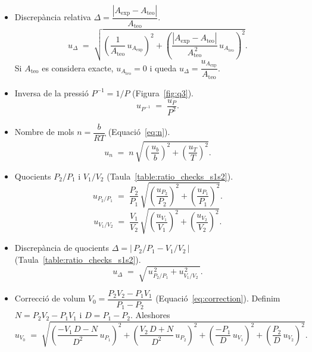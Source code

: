 \documentclass[a4paper,twoside,12pt]{article}
\theoremstyle{definition}
\begin{document}
\begin{itemize}
	\item Discrepància relativa \(\Delta=\dfrac{|A_{\mathrm{exp}}-A_{\mathrm{teo}}|}{A_{\mathrm{teo}}}\).
	\begin{equation}\label{eq:incertesa_delta_A}
		u_\Delta \;=\; 
		\sqrt{\left(\frac{1}{A_{\mathrm{teo}}}\,u_{A_{\mathrm{exp}}}\right)^2
			+\left(\frac{|A_{\mathrm{exp}}-A_{\mathrm{teo}}|}{A_{\mathrm{teo}}^{\,2}}\,u_{A_{\mathrm{teo}}}\right)^2 }.
	\end{equation}
	Si \(A_{\mathrm{teo}}\) es considera exacte, \(u_{A_{\mathrm{teo}}}=0\) i queda \(u_\Delta=\dfrac{u_{A_{\mathrm{exp}}}}{A_{\mathrm{teo}}}\).
	
	\item Inversa de la pressió \(P^{-1}=1/P\) (Figura~\ref{fig:q3}).
	\begin{equation}\label{eq:incertesa_P_inv}
		u_{P^{-1}} \;=\; \frac{u_P}{P^2}.
	\end{equation}
	
	\item Nombre de mols \(n=\dfrac{b}{RT}\) (Equació~\ref{eq:n}).
	\begin{equation}\label{eq:incertesa_n}
		u_n \;=\; n\,\sqrt{\left(\frac{u_b}{b}\right)^2+\left(\frac{u_T}{T}\right)^2 }.
	\end{equation}
	
	\item Quocients \(P_2/P_1\) i \(V_1/V_2\) (Taula~\ref{table:ratio_checks_s1s2}).
	\begin{equation}\label{eq:incertesa_P2sobreP1}
		u_{P_2/P_1} \;=\; \frac{P_2}{P_1}\,
		\sqrt{\left(\frac{u_{P_2}}{P_2}\right)^2+\left(\frac{u_{P_1}}{P_1}\right)^2 }.
	\end{equation}
	\begin{equation}\label{eq:incertesa_V1sobreV2}
		u_{V_1/V_2} \;=\; \frac{V_1}{V_2}\,
		\sqrt{\left(\frac{u_{V_1}}{V_1}\right)^2+\left(\frac{u_{V_2}}{V_2}\right)^2 }.
	\end{equation}
	\item Discrepància de quocients \(\Delta=\big|\,P_2/P_1 - V_1/V_2\,\big|\) (Taula~\ref{table:ratio_checks_s1s2}).
	\begin{equation}\label{eq:incertesa_delta_quotients}
		u_\Delta \;=\; \sqrt{\,u_{P_2/P_1}^{\,2} + u_{V_1/V_2}^{\,2}\,}.
	\end{equation}
	
	\item Correcció de volum \(V_0=\dfrac{P_2V_2-P_1V_1}{P_1-P_2}\) (Equació~\ref{eq:correction}). Definim \(N=P_2V_2-P_1V_1\) i \(D=P_1-P_2\). Aleshores
	\begin{equation}\label{eq:incertesa_V0}
		u_{V_0} \;=\; \sqrt{
			\left(\frac{-V_1\,D - N}{D^2}\,u_{P_1}\right)^2
			+\left(\frac{ V_2\,D + N}{D^2}\,u_{P_2}\right)^2
			+\left(\frac{-P_1}{D}\,u_{V_1}\right)^2
			+\left(\frac{ P_2}{D}\,u_{V_2}\right)^2 }.
	\end{equation}
	

\end{itemize}
\end{document}
